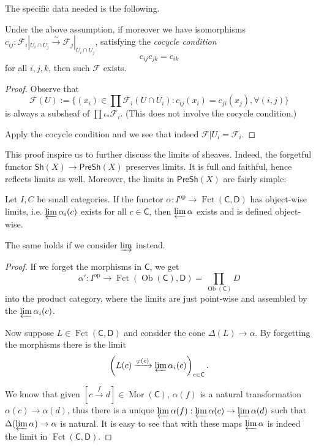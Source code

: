 The specific data needed is the following.

\begin{proposition}\label{prop.sheafglue}
    Under the above assumption, if moreover we have isomorphisms $c_{ij}:\mathcal{F}_i|_{U_i\cap U_j}\xrightarrow{\sim}\mathcal{F}_j|_{U_i\cap U_j}$, satisfying the \emph{cocycle condition}
    $$c_{ij}c_{jk}=c_{ik}$$
    for all $i,j,k$, then such $\mathcal{F}$ exists.
\end{proposition}

\begin{proof}
    Observe that 
    $$\mathcal{F}(U):=\{(x_i)\in\prod\mathcal{F}_i(U\cap U_i):c_{ij}(x_i)=c_{ji}(x_j),\forall(i,j)\}$$
    is always a subsheaf of $\prod\iota_*\mathcal{F}_i$. (This does not involve the cocycle condition.)

    Apply the cocycle condition and we see that indeed $\mathcal{F}|U_i=\mathcal{F}_i$.
\end{proof}

This proof inspire us to further discuss the limits of sheaves. Indeed, the forgetful functor $\mathsf{Sh}(X)\to\mathsf{PreSh}(X)$ preserves limits. It is full and faithful, hence reflects limits as well. Moreover, the limits in $\mathsf{PreSh}(X)$ are fairly simple:

\begin{lemma}\label{lemma.functorlim}
    Let $I,C$ be small categories.
    If the functor $\alpha:I^{\operatorname{op}}\to\operatorname{Fct}(\mathsf{C},\mathsf{D})$ has object-wise limits, i.e. $\varprojlim\alpha_i(c)$ exists for all $c\in\mathsf{C}$, then $\varprojlim\alpha$ exists and is defined object-wise.

    The same holds if we consider $\varinjlim$ instead.
\end{lemma}

\begin{proof}
    If we forget the morphisms in $\mathsf{C}$, we get 
    $$\alpha':I^{\operatorname{op}}\to\operatorname{Fct}(\operatorname{Ob}(\mathsf{C}),\mathsf{D})=\prod_{\operatorname{Ob}(\mathsf{C})}D$$
    into the product category, where the limits are just point-wise and assembled by the $\varprojlim\alpha_i(c)$.

    Now suppose $L\in\operatorname{Fct}(\mathsf{C},\mathsf{D})$ and consider the cone $\Delta(L)\to\alpha$. By forgetting the morphisms there is the limit
    $$\left(L(c)\xrightarrow{\varphi(c)}\varprojlim\alpha_i(c)\right)_{c\in \mathsf{C}}.$$

    We know that given $[c\xrightarrow{f}d]\in\operatorname{Mor}(\mathsf{C})$, $\alpha(f)$ is a natural transformation $\alpha(c)\to\alpha(d)$, thus there is a unique $\varprojlim\alpha(f):\varprojlim\alpha(c)\to\varprojlim\alpha(d)$ such that $\Delta(\varprojlim\alpha)\to\alpha$ is natural. It is easy to see that with these maps $\varprojlim\alpha$ is indeed the limit in $\operatorname{Fct}(\mathsf{C},\mathsf{D})$.
\end{proof}

